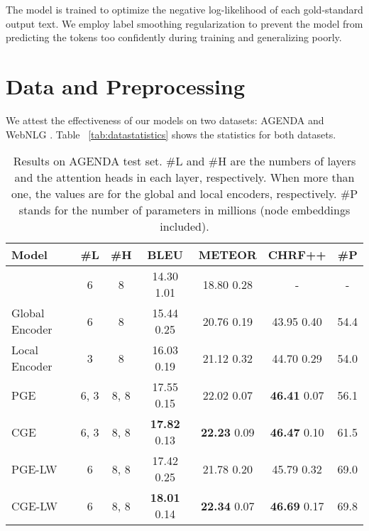 \documentclass[11pt,a4paper]{article}
\begin{document}
The model is trained to optimize the negative log-likelihood of each gold-standard output text. We employ label smoothing regularization to prevent the model from predicting the tokens too confidently during training and generalizing poorly.







 

\section{Data and Preprocessing}

We attest the effectiveness of our models on two datasets: AGENDA \cite{koncel-kedziorski-etal-2019-text} and WebNLG \cite{gardent-etal-2017-webnlg}. Table ~\ref{tab:datastatistics} shows the statistics for both datasets.

\begin{table*}[h]
\centering
{\renewcommand{\arraystretch}{0.8}
\begin{tabular}{lcccccc}  
\toprule
\textbf{Model} & \textbf{\#L} & \textbf{\#H} & \textbf{BLEU} & \textbf{METEOR} & \textbf{CHRF++} & \textbf{\#P}   \\
\midrule
 \citet{koncel-kedziorski-etal-2019-text} & 6 & 8 & 14.30 {\small 1.01}& 18.80 {\small 0.28} & - & - \\
\midrule
 Global Encoder & 6 & 8 & 15.44 {\small 0.25} & 20.76 {\small 0.19} & 43.95 {\small 0.40} & 54.4 \\
 Local Encoder & 3 & 8 & 16.03 {\small 0.19} & 21.12 {\small 0.32} & 44.70 {\small 0.29} & 54.0 \\
  PGE & 6, 3 & 8, 8 & 17.55 {\small 0.15} & 22.02 {\small 0.07} & \textbf{46.41} {\small 0.07}& 56.1 \\
 CGE & 6, 3 & 8, 8 & \textbf{17.82} {\small 0.13} & \textbf{22.23} {\small 0.09} & \textbf{46.47} {\small 0.10} & 61.5 \\
   PGE-LW  & 6 & 8, 8 & 17.42 {\small 0.25} & 21.78 {\small 0.20} & 45.79 {\small 0.32} & 69.0 \\
  CGE-LW & 6 & 8, 8 & \textbf{18.01} {\small 0.14} & \textbf{22.34} {\small 0.07} & \textbf{46.69} {\small 0.17} & 69.8 \\
\bottomrule
\end{tabular}}
\caption{Results on AGENDA test set. \#L and \#H are the numbers of layers and the attention heads in each layer, respectively. When more than one, the values are for the global and local encoders, respectively. \#P stands for the number of parameters in millions (node embeddings included).}
\label{tab:AGENDAtestresults}
\end{table*}
\end{document}
